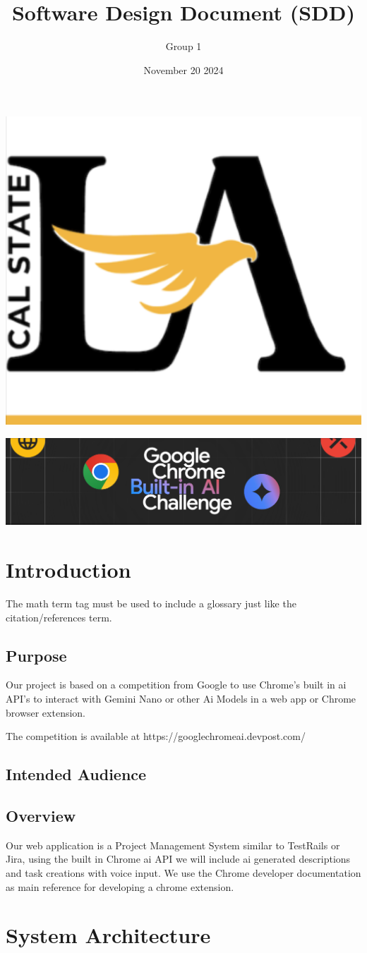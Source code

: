 \documentclass{article}
\title{Software Design Document (SDD)}
\author{Group 1 }
\date{November 20 2024}
\begin{document}
\maketitle  
\pagebreak

\tableofcontents
\pagebreak

\includegraphics[width=0.3\linewidth]{./logo/csula.png} 

\includegraphics[width=0.3\linewidth]{./logo/chromeai.png} 
\section{Introduction}
The \Gls{math} term tag must be used to include a glossary just like the citation/references \gls{term}. 
\subsection{Purpose}
Our project is based on a competition from Google to use Chrome's built in \Gls{ai} API's to interact with Gemini Nano or other Ai Models in a web app or Chrome browser extension. 

The competition is available at https://googlechromeai.devpost.com/

\subsection{Intended Audience}
\lipsum[2]

\subsection{Overview}
Our web application is a Project Management System similar to TestRails or Jira, using the built in Chrome \Gls{ai} API we will include ai generated descriptions and task creations with voice input. We use the Chrome developer documentation\cite{dev} as main reference for developing a chrome extension.

\section{System Architecture}
\end{document}

